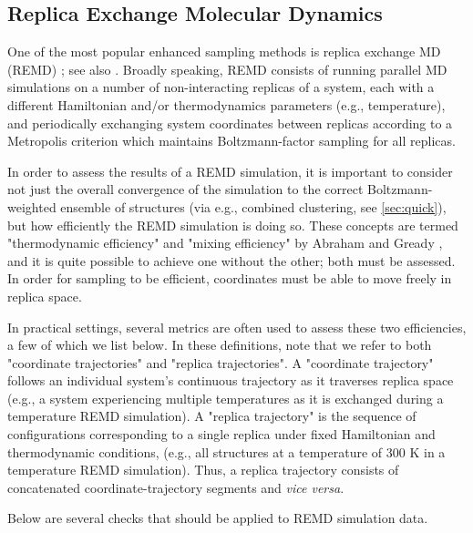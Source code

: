 \subsection{Replica Exchange Molecular Dynamics}
One of the most popular enhanced sampling methods is replica exchange MD (REMD) \citep{Sugita1999}; see also \cite{Swendsen-1986}. Broadly speaking, REMD consists of running parallel MD simulations on a number of non-interacting replicas of a system, each with a different Hamiltonian and/or thermodynamics parameters (e.g., temperature), and periodically exchanging system coordinates between replicas according to a Metropolis criterion which maintains Boltzmann-factor sampling for all replicas.  



In order to assess the results of a REMD simulation, it is important to consider not just the overall convergence of the simulation to the correct Boltzmann-weighted ensemble of structures (via e.g., combined clustering, see \ref{sec:quick}), but how efficiently the REMD simulation is doing so. These concepts are termed "thermodynamic efficiency" and "mixing efficiency" by Abraham and Gready \citep{Abraham2008}, and it is quite possible to achieve one without the other; both must be assessed. In order for sampling to be efficient, coordinates must be able to move freely in replica space.

In practical settings, several metrics are often used to assess these two efficiencies, a few of which we list below.  In these definitions, note that we refer to both "coordinate trajectories" and "replica trajectories". A "coordinate trajectory" follows an individual system's continuous trajectory as it traverses replica space (e.g., a system experiencing multiple temperatures as it is exchanged during a temperature REMD simulation). A "replica trajectory" is the sequence of configurations corresponding to a single replica under fixed Hamiltonian and thermodynamic conditions, (e.g., all structures at a temperature of 300 K in a temperature REMD simulation).  Thus, a replica trajectory consists of concatenated coordinate-trajectory segments and \textit{vice versa}.

Below are several checks that should be applied to REMD simulation data.

